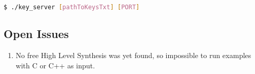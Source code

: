 \begin{refsection}
\begin{lstlisting}[caption={Deploying QT application}, language=bash, captionpos=b]
$ ./key_server [pathToKeysTxt] [PORT]
\end{lstlisting}

\subsection{Open Issues}

\begin{enumerate}  
\item No free High Level Synthesis was yet found, so impossible to run examples with C or C++ as input.
\end{enumerate}

\clearpage
\printbibliography[heading=subbibliography]
\end{refsection}
\cleardoublepage
